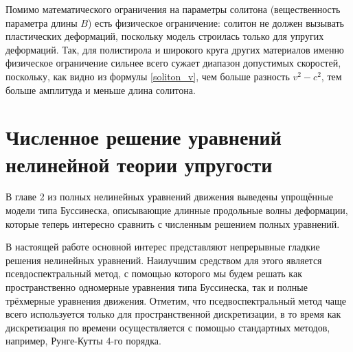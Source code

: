 \documentclass[12pt, a4paper]{report}
\begin{document}
Помимо математического ограничения на параметры солитона (вещественность параметра длины $B$) есть физическое ограничение: солитон не должен вызывать пластических деформаций, поскольку модель строилась только для упругих деформаций. Так, для полистирола и широкого круга других материалов именно физическое ограничение сильнее всего сужает диапазон допустимых скоростей, поскольку, как видно из формулы \eqref{soliton_v}, чем больше разность ${v^2-c^2}$, тем больше амплитуда и меньше длина солитона.



\chapter{Численное решение уравнений нелинейной теории упругости}
В главе 2 из полных нелинейных уравнений движения 
выведены упрощённые модели типа Буссинеска, описывающие длинные продольные волны деформации, которые теперь интересно сравнить с численным решением полных уравнений.

В настоящей работе основной интерес представляют непрерывные гладкие решения нелинейных уравнений. Наилучшим средством для этого является псевдоспектральный метод, с помощью которого мы будем решать как пространственно одномерные уравнения типа Буссинеска, так и полные трёхмерные уравнения движения.
Отметим, что пседвоспектральный метод чаще всего используется только для пространственной дискретизации, в то время как дискретизация по времени осуществляется с помощью стандартных методов, например, Рунге-Кутты 4-го порядка.
\end{document}
